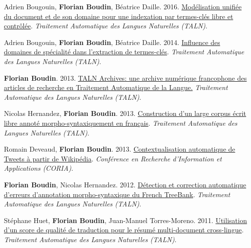 \item 
Adrien Bougouin, \textbf{Florian Boudin}, Béatrice Daille.
2016.
\href{https://aclanthology.org/2016.jeptalnrecital-long.18.pdf}{Modélisation unifiée du document et de son domaine pour une indexation par termes-clés libre et contrôlée}.
\textit{Traitement Automatique des Langues Naturelles (TALN)}.
\label{bougouin-etal-2016-modelisation}

\item 
Adrien Bougouin, \textbf{Florian Boudin}, Béatrice Daille.
2014.
\href{https://aclanthology.org/F14-1002.pdf}{Influence des domaines de spécialité dans l’extraction de termes-clés}.
\textit{Traitement Automatique des Langues Naturelles (TALN)}.
\label{bougouin-etal-2014-influence}

\item 
\textbf{Florian Boudin}.
2013.
\href{https://aclanthology.org/F13-2001.pdf}{TALN Archives: une archive numérique francophone des articles de recherche en Traitement Automatique de la Langue.}
\textit{Traitement Automatique des Langues Naturelles (TALN)}.
\label{boudin-2013-taln}

\item 
Nicolas Hernandez, \textbf{Florian Boudin}.
2013.
\href{https://aclanthology.org/F13-1012.pdf}{Construction d’un large corpus écrit libre annoté morpho-syntaxiquement en français}.
\textit{Traitement Automatique des Langues Naturelles (TALN)}.
\label{hernandez-boudin-2013-construction}

\item 
Romain Deveaud, \textbf{Florian Boudin}.
2013.
\href{https://asso-aria.org/coria/2013/coria/coria2013_23.pdf}{Contextualisation automatique de Tweets à partir de Wikipédia}.
\textit{Conférence en Recherche d’Information et Applications (CORIA)}.
\label{deveaud-boudin-2013-contextualisation}

\item 
\textbf{Florian Boudin}, Nicolas Hernandez.
2012.
\href{https://aclanthology.org/F12-2021.pdf}{Détection et correction automatique d’erreurs d’annotation morpho-syntaxique du French TreeBank}.
\textit{Traitement Automatique des Langues Naturelles (TALN)}.
\label{boudin-hernandez-2012-detection}

\item 
Stéphane Huet, \textbf{Florian Boudin}, Juan-Manuel Torres-Moreno.
2011.
\href{https://aclanthology.org/2011.jeptalnrecital-long.5.pdf}{Utilisation d’un score de qualité de traduction pour le résumé multi-document cross-lingue}.
\textit{Traitement Automatique des Langues Naturelles (TALN)}.
\label{huet-etal-2011-utilisation}

